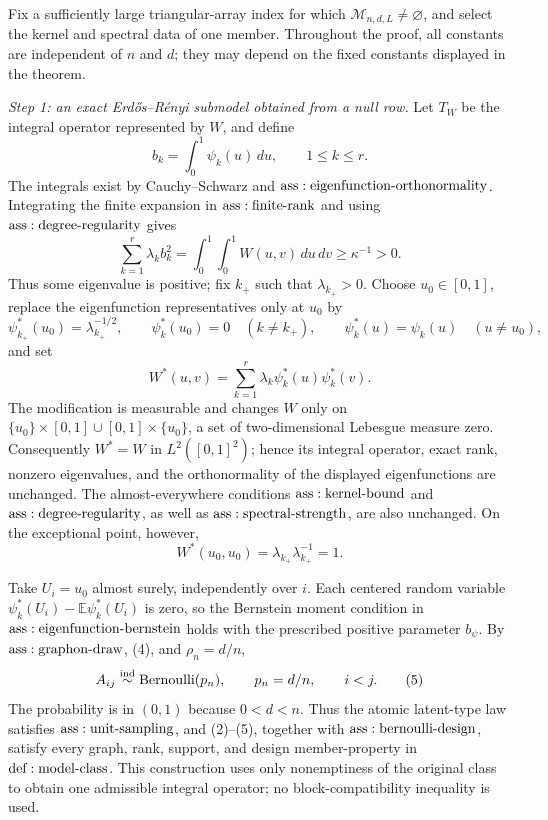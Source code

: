 Fix a sufficiently large triangular-array index for which \(\mathcal M_{n,d,L}\neq\varnothing\), and select the kernel and spectral data of one member.  Throughout the proof, all constants are independent of \(n\) and \(d\); they may depend on the fixed constants displayed in the theorem.

\textit{Step 1: an exact Erd\H{o}s--R\'enyi submodel obtained from a null row.}
Let \(T_W\) be the integral operator represented by \(W\), and define
\[
 b_k=\int_0^1\psi_k(u)\,du,\qquad 1\leq k\leq r.
\]
The integrals exist by Cauchy--Schwarz and \({\rm ass:eigenfunction\text{-}orthonormality}\).  Integrating the finite expansion in \({\rm ass:finite\text{-}rank}\) and using \({\rm ass:degree\text{-}regularity}\) gives
\[
 \sum_{k=1}^r\lambda_kb_k^2
 =\int_0^1\!\int_0^1W(u,v)\,du\,dv
 \geq\kappa^{-1}>0.
\tag{1}
\]
Thus some eigenvalue is positive; fix \(k_+\) such that \(\lambda_{k_+}>0\).  Choose \(u_0\in[0,1]\), replace the eigenfunction representatives only at \(u_0\) by
\[
 \psi_{k_+}^*(u_0)=\lambda_{k_+}^{-1/2},
 \qquad
 \psi_k^*(u_0)=0\quad(k\neq k_+),
 \qquad
 \psi_k^*(u)=\psi_k(u)\quad(u\neq u_0),
\tag{2}
\]
and set
\[
 W^*(u,v)=\sum_{k=1}^r\lambda_k\psi_k^*(u)\psi_k^*(v).
\tag{3}
\]
The modification is measurable and changes \(W\) only on
\(\{u_0\}\times[0,1]\cup[0,1]\times\{u_0\}\), a set of two-dimensional Lebesgue measure zero.  Consequently \(W^*=W\) in \(L^2([0,1]^2)\); hence its integral operator, exact rank, nonzero eigenvalues, and the orthonormality of the displayed eigenfunctions are unchanged.  The almost-everywhere conditions \({\rm ass:kernel\text{-}bound}\) and \({\rm ass:degree\text{-}regularity}\), as well as \({\rm ass:spectral\text{-}strength}\), are also unchanged.  On the exceptional point, however,
\[
 W^*(u_0,u_0)=\lambda_{k_+}\lambda_{k_+}^{-1}=1.
\tag{4}
\]

Take \(U_i=u_0\) almost surely, independently over \(i\).  Each centered random variable \(\psi_k^*(U_i)-\mathbb E\psi_k^*(U_i)\) is zero, so the Bernstein moment condition in \({\rm ass:eigenfunction\text{-}bernstein}\) holds with the prescribed positive parameter \(b_\psi\).  By \({\rm ass:graphon\text{-}draw}\), (4), and \(\rho_n=d/n\),
\[
 A_{ij}\overset{\mathrm{ind}}{\sim}{\rm Bernoulli}(p_n),
 \qquad p_n=d/n,
 \qquad i<j.
\tag{5}
\]
The probability is in \((0,1)\) because \(0<d<n\).  Thus the atomic latent-type law satisfies \({\rm ass:unit\text{-}sampling}\), and (2)--(5), together with \({\rm ass:bernoulli\text{-}design}\), satisfy every graph, rank, support, and design member-property in \({\rm def:model\text{-}class}\).  This construction uses only nonemptiness of the original class to obtain one admissible integral operator; no block-compatibility inequality is used.

